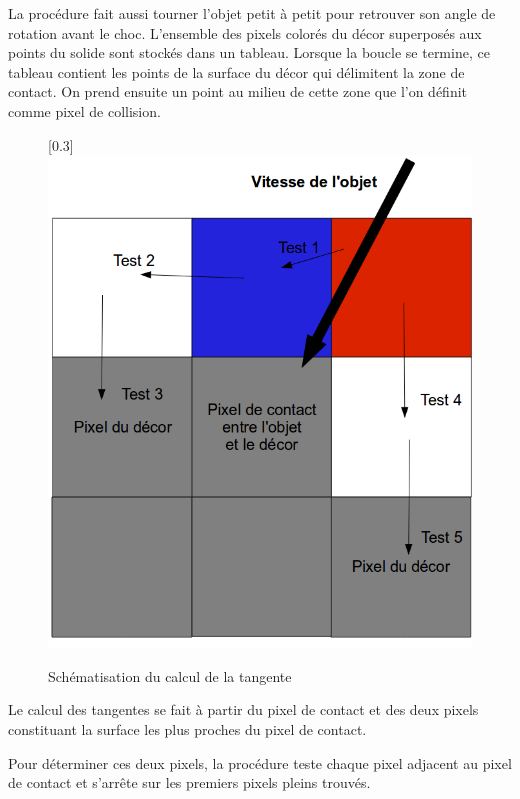 La procédure fait aussi tourner l'objet petit à petit pour retrouver
son angle de rotation avant le choc.
L'ensemble des pixels colorés du décor superposés aux points du solide
sont stockés dans un tableau. Lorsque la boucle se termine, ce tableau
contient les points de la surface du décor qui délimitent la zone de contact.
On prend ensuite un point au milieu de cette zone que l'on définit comme pixel de collision.\\

\begin{center}
\begin{figure}[h]
\begin{center}
\scalebox{0.3}[0.3]{\includegraphics*{../images/tangente.png}}
\end{center}
\caption{Schématisation du calcul de la tangente}
\end{figure}
\end{center}

Le calcul des tangentes se fait à partir du pixel de contact et des deux pixels
constituant la surface les plus proches du pixel de contact.

Pour déterminer ces deux pixels, la procédure teste chaque pixel adjacent
au pixel de contact et s'arrête sur les premiers pixels pleins trouvés.

